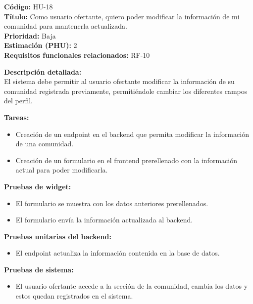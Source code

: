 \begin{tarjetaHU}
\textbf{Código:} HU-18 \\
\textbf{Título:} Como usuario ofertante, quiero poder modificar la información de mi comunidad para mantenerla actualizada. \\
\textbf{Prioridad:} Baja \\
\textbf{Estimación (PHU):} 2 \\
\textbf{Requisitos funcionales relacionados:} RF-10

\vspace{0.5em}
\textbf{Descripción detallada:} \\
El sistema debe permitir al usuario ofertante modificar la información de su comunidad registrada previamente, permitiéndole cambiar los diferentes campos del perfil.

\vspace{0.5em}
\textbf{Tareas:}
\begin{itemize}[left=0pt]
  \item Creación de un endpoint en el backend que permita modificar la información de una comunidad. 
  \item Creación de un formulario en el frontend prerellenado con la información actual para poder modificarla.
\end{itemize}

\vspace{0.5em}
\textbf{Pruebas de widget:}
\begin{itemize}[left=0pt]
  \item El formulario se muestra con los datos anteriores prerellenados.
  \item El formulario envía la información actualizada al backend.
\end{itemize}
\textbf{Pruebas unitarias del backend:}
\begin{itemize}[left=0pt]
  \item El endpoint actualiza la información contenida en la base de datos.
\end{itemize}
\textbf{Pruebas de sistema:}
\begin{itemize}[left=0pt]
    \item El usuario ofertante accede a la sección de la comunidad, cambia los datos y estos quedan registrados en el sistema.
\end{itemize}
\end{tarjetaHU}

